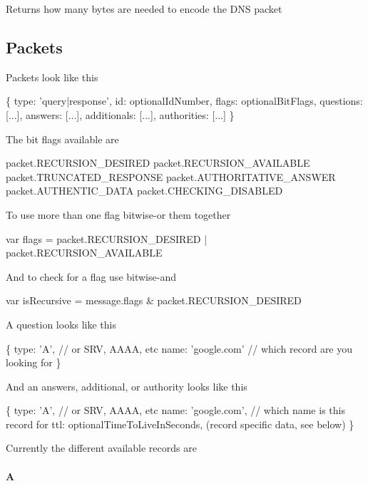 Returns how many bytes are needed to encode the D\+NS packet

\subsection*{Packets}

Packets look like this


\begin{DoxyCode}
\{
  type: 'query|response',
  id: optionalIdNumber,
  flags: optionalBitFlags,
  questions: [...],
  answers: [...],
  additionals: [...],
  authorities: [...]
\}
\end{DoxyCode}


The bit flags available are


\begin{DoxyCode}
packet.RECURSION\_DESIRED
packet.RECURSION\_AVAILABLE
packet.TRUNCATED\_RESPONSE
packet.AUTHORITATIVE\_ANSWER
packet.AUTHENTIC\_DATA
packet.CHECKING\_DISABLED
\end{DoxyCode}


To use more than one flag bitwise-\/or them together


\begin{DoxyCode}
var flags = packet.RECURSION\_DESIRED | packet.RECURSION\_AVAILABLE
\end{DoxyCode}


And to check for a flag use bitwise-\/and


\begin{DoxyCode}
var isRecursive = message.flags & packet.RECURSION\_DESIRED
\end{DoxyCode}


A question looks like this


\begin{DoxyCode}
\{
  type: 'A', // or SRV, AAAA, etc
  name: 'google.com' // which record are you looking for
\}
\end{DoxyCode}


And an answers, additional, or authority looks like this


\begin{DoxyCode}
\{
  type: 'A', // or SRV, AAAA, etc
  name: 'google.com', // which name is this record for
  ttl: optionalTimeToLiveInSeconds,
  (record specific data, see below)
\}
\end{DoxyCode}


Currently the different available records are

\paragraph*{{\ttfamily A}}


